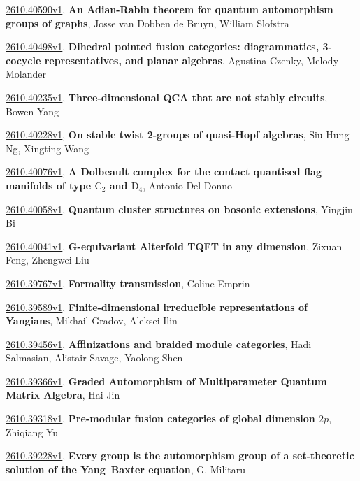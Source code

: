 \documentclass[9pt, a4paper]{article}
\theoremstyle{plain}
\theoremstyle{definition}
\theoremstyle{remark}
\newcommand{\arxiv}[3]{\href{https://arxiv.org/abs/#1}{#1}, \textbf{\textcolor{arxivblue}{#2}}, #3}
\begin{document}
\arxiv{2610.40590v1}{An Adian-Rabin theorem for quantum automorphism groups of graphs}{Josse van Dobben de Bruyn, William Slofstra}

\arxiv{2610.40498v1}{Dihedral pointed fusion categories: diagrammatics, 3-cocycle representatives, and planar algebras}{Agustina Czenky, Melody Molander}

\arxiv{2610.40235v1}{Three-dimensional QCA that are not stably circuits}{Bowen Yang}

\arxiv{2610.40228v1}{On stable twist 2-groups of quasi-Hopf algebras}{Siu-Hung Ng, Xingting Wang}

\arxiv{2610.40076v1}{A Dolbeault complex for the contact quantised flag manifolds of type $\mathrm{C}_{2}$ and $\mathrm{D}_{4}$}{Antonio Del Donno}

\arxiv{2610.40058v1}{Quantum cluster structures on bosonic extensions}{Yingjin Bi}

\arxiv{2610.40041v1}{G-equivariant Alterfold TQFT in any dimension}{Zixuan Feng, Zhengwei Liu}

\arxiv{2610.39767v1}{Formality transmission}{Coline Emprin}

\arxiv{2610.39589v1}{Finite-dimensional irreducible representations of Yangians}{Mikhail Gradov, Aleksei Ilin}

\arxiv{2610.39456v1}{Affinizations and braided module categories}{Hadi Salmasian, Alistair Savage, Yaolong Shen}

\arxiv{2610.39366v1}{Graded Automorphism of Multiparameter Quantum Matrix Algebra}{Hai Jin}

\arxiv{2610.39318v1}{Pre-modular fusion categories of global dimension $2p$}{Zhiqiang Yu}

\arxiv{2610.39228v1}{Every group is the automorphism group of a set-theoretic solution of the Yang--Baxter equation}{G. Militaru}

\end{document}
